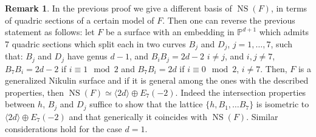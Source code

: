 \documentclass{amsart}
\theoremstyle{definition}
\newtheorem{rem}[thm]{Remark}
\numberwithin{equation}{section}
\numberwithin{equation}{section} \theoremstyle{definition}
\DeclareMathOperator{\NS}{NS}
\begin{document}
\begin{rem}\label{rem: vice versa proj models direct sum} In the previous proof we give a different basis of $\NS(F)$, in terms of quadric sections of a certain model of $F$. Then one can reverse the previous statement as follows: let $F$ be a surface with an embedding in $\mathbb{P}^{d+1}$ which admits 7 quadric sections which split each in two curves $B_j$ and $D_j$, $j=1,\ldots, 7$, such that: $B_j$ and $D_j$ have genus $d-1$, and $B_iB_j=2d-2$ $i\neq j$, and $i,j\neq 7$, $B_7B_i=2d-2$ if $i\equiv 1 \mod 2$ and  $B_7B_i=2d$ if $i\equiv 0\mod 2$, $i\neq 7$. Then, $F$ is a generalized Nikulin surface and if it is general among the ones with the described properties, then $\NS(F)\simeq \langle 2d\rangle\oplus E_7(-2)$. Indeed the intersection properties between $h$, $B_j$ and $D_j$ suffice to show that the lattice $\{h,B_1,\ldots B_7\}$ is isometric to $\langle 2d\rangle\oplus E_7(-2)$ and that generically it coincides with $\NS(F)$. Similar considerations hold for the case $d=1$.
\end{rem}
\end{document}
